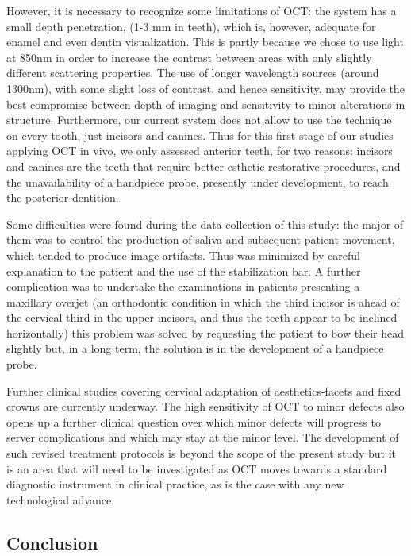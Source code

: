 \documentclass[12pt,twoside,english]{book}
\renewcommand{\~}{\perispomeni}%
\numberwithin{equation}{section}
\numberwithin{figure}{section}
\begin{document}
However, it is necessary to recognize some limitations of OCT: the system has a small depth penetration, (1-3 mm in teeth), which is, however, adequate for enamel and even dentin visualization. This is partly because we chose to use light at 850nm in order to increase the contrast between areas with only slightly different scattering properties. The use of longer wavelength sources (around 1300nm), with some slight loss of contrast, and hence sensitivity, may provide the best compromise between depth of imaging and sensitivity to minor alterations in structure. Furthermore, our current system does not allow to use the technique on every tooth, just incisors and canines. Thus for this first stage of our studies applying OCT in vivo, we only assessed anterior teeth, for two reasons: incisors and canines are the teeth that require better esthetic restorative procedures, and the unavailability of a handpiece probe, presently under development, to reach the posterior dentition.

Some difficulties were found during the data collection of this study: the major of them was to control the production of saliva and subsequent patient movement, which tended to produce image artifacts. Thus was minimized by careful explanation to the patient and the use of the stabilization bar. A further complication was to undertake the examinations in patients presenting a maxillary overjet (an orthodontic condition in which the third incisor is ahead of the cervical third in the upper incisors, and thus the teeth appear to be inclined horizontally) \textendash{} this problem was solved by requesting the patient to bow their head slightly but, in a long term, the solution is in the development of a handpiece probe.

Further clinical studies covering cervical adaptation of aesthetics-facets and fixed crowns are currently underway. The high sensitivity of OCT to minor defects also opens up a further clinical question over which minor defects will progress to server complications and which may stay at the minor level. The development of such revised treatment protocols is beyond the scope of the present study but it is an area that will need to be investigated as OCT moves towards a standard diagnostic instrument in clinical practice, as is the case with any new technological advance.

\subsection{Conclusion}
\end{document}
